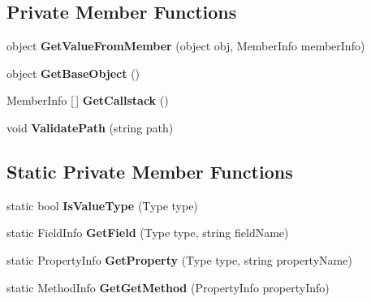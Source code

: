\subsection*{Private Member Functions}
\begin{DoxyCompactItemize}
\item 
\mbox{\label{class_unity_test_1_1_member_resolver_a0a363e01eec4d0ef9473bfec23143f47}} 
object {\bfseries Get\+Value\+From\+Member} (object obj, Member\+Info member\+Info)
\item 
\mbox{\label{class_unity_test_1_1_member_resolver_a8d8db9e88208340377c7d88a0b468310}} 
object {\bfseries Get\+Base\+Object} ()
\item 
\mbox{\label{class_unity_test_1_1_member_resolver_a7a6e350b61d9ef8ed68700ba7f7d97e2}} 
Member\+Info \mbox{[}$\,$\mbox{]} {\bfseries Get\+Callstack} ()
\item 
\mbox{\label{class_unity_test_1_1_member_resolver_a6ea33d4e6caeb628457ad7c4b64fff82}} 
void {\bfseries Validate\+Path} (string path)
\end{DoxyCompactItemize}
\subsection*{Static Private Member Functions}
\begin{DoxyCompactItemize}
\item 
\mbox{\label{class_unity_test_1_1_member_resolver_a883bfbc4b3dbd80d239ce4ee5de84820}} 
static bool {\bfseries Is\+Value\+Type} (Type type)
\item 
\mbox{\label{class_unity_test_1_1_member_resolver_a115293aa9de01e6dd14ecd07f7a67aaa}} 
static Field\+Info {\bfseries Get\+Field} (Type type, string field\+Name)
\item 
\mbox{\label{class_unity_test_1_1_member_resolver_a7ee69dc13f07c29ecdf1075ff810b713}} 
static Property\+Info {\bfseries Get\+Property} (Type type, string property\+Name)
\item 
\mbox{\label{class_unity_test_1_1_member_resolver_a3b22fc2e593b269d8458740a6ab5e124}} 
static Method\+Info {\bfseries Get\+Get\+Method} (Property\+Info property\+Info)
\end{DoxyCompactItemize}
